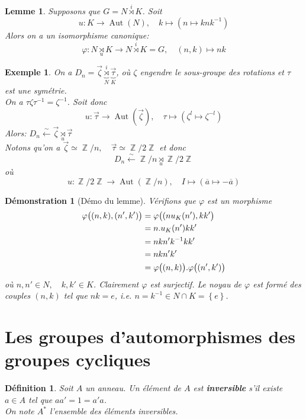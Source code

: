 \documentclass[a4paper, oneside]{report}
\theoremstyle{break}
\newtheorem{lemme}[thm]{Lemme}
\newtheorem{definition}[thm]{Définition}
\newtheorem{exemple}[thm]{Exemple}
\newtheorem*{demonstration}{Démonstration}
\DeclareMathOperator{\Z}{\mathbb{Z}}
\DeclarePairedDelimiter\ens{\left\{ }{\right\} }%
\DeclarePairedDelimiter\pa{\big(}{\big)}%
\DeclareMathOperator{\Aut}{Aut}
\renewcommand{\ens}[1]{\left\{ #1 \right\} }%
\newcommand{\slign}{\textbf}
\newcommand{\us}{\underset}
\newcommand{\os}{\overset}
\newcommand{\ol}{\overline}
\newcommand{\ub}{\underbrace}
\begin{document}
\begin{lemme}
Supposons que $G = N \os{i}{\rtimes} K$. Soit
\[
u : K \rightarrow \Aut(N), \quad	k \mapsto (n \mapsto k n k^{-1})
\]
Alors on a un isomorphisme canonique:
\[
\varphi : N \us{u}{\rtimes} K \rightarrow N \os{i}{\rtimes} K = G, \quad	(n,k) \mapsto nk
\]
\end{lemme}

\begin{exemple}
On a $D_n = \vec{\zeta} \ub{\os{i}{\rtimes}}_{N} \ub{\vec{\tau}}_{K}$, où $\zeta$ engendre le sous-groupe des rotations et $\tau$ est une symétrie.\\
On a $\tau\zeta\tau^{-1} = \zeta^{-1}$. Soit donc 
\[
u : \vec{\tau} \rightarrow \Aut(\vec{\zeta}), \quad	\tau \mapsto (\zeta^l \mapsto \zeta^{-l})
\]
Alors: $D_n \os{\sim}{\leftarrow} \vec{\zeta} \us{u}{\rtimes} \vec{\tau}$\\
Notons qu'on a $\vec{\zeta} \simeq \Z/n, \quad	\vec{\tau} \simeq \Z/2\Z$ et donc 
\[
D_n \os{\sim}{\leftarrow} \Z/n \us{u}{\rtimes} \Z/2\Z
\]
où
\[
u : \Z/2\Z \rightarrow \Aut(\Z/n), \quad	I \mapsto (\ol{a} \mapsto -\ol{a})
\]
\end{exemple}

\begin{demonstration}[Démo du lemme]
Vérifions que $\varphi$ est un morphisme
\begin{align*}
\varphi \pa{(n, k), (n', k')} &= \varphi\pa{(n u_K(n'), kk'} 
\\
&= n . u_K(n') kk' 
\\
&= nkn'k^{-1}kk' 
\\
&= nkn'k'
\\
&= \varphi\pa{(n,k)} . \varphi\pa{(n', k')}
\end{align*}
où $n, n' \in N, \quad k, k' \in K$. Clairement $\varphi$ est surjectif. Le noyau de $\varphi$ est formé des couples $(n, k)$ tel que $nk = e$, i.e. $n = k^{-1} \in N \cap K = \ens{e}$.
\end{demonstration}

\section{Les groupes d'automorphismes des groupes cycliques}

\begin{definition}
Soit $A$ un anneau. Un élément de $A$ est \slign{inversible} s'il existe $a \in A$ tel que $aa' = 1 = a'a$.\\
On note $A^*$ l'ensemble des éléments inversibles.
\end{definition}
\end{document}
